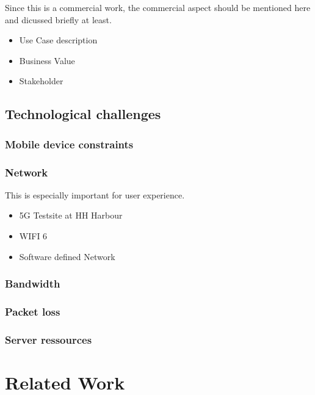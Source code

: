 \documentclass[titlepage, a4paper, 11pt]{scrartcl}
\begin{document}
            Since this is a commercial work, the commercial aspect should be mentioned here and dicussed briefly at least.

            \begin{itemize}
                \item Use Case description
                \item Business Value
                \item Stakeholder
            \end{itemize}
		
        \subsection{Technological challenges}

            \subsubsection{Mobile device constraints}

            \subsubsection{Network}

                This is especially important for user experience. 

                \begin{itemize}
                    \item 5G Testsite at HH Harbour
                    \item WIFI 6
                    \item Software defined Network
                \end{itemize}

            \subsubsection{Bandwidth}

            \subsubsection{Packet loss}

            \subsubsection{Server ressources}
        
        \section{Related Work}
\end{document}
